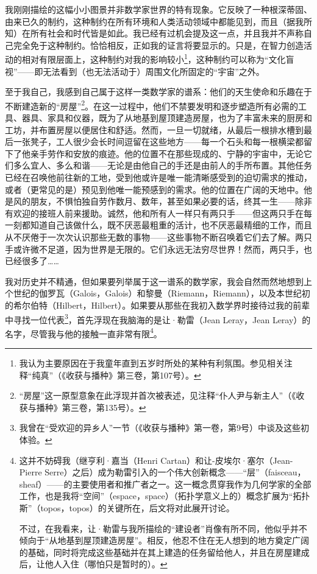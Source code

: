我刚刚描绘的这幅小小图景并非数学家世界的特有现象。它反映了一种根深蒂固、由来已久的制约，这种制约在所有环境和人类活动领域中都能见到，而且（据我所知）在所有社会和时代皆是如此。我已经有过机会提及这一点，并且我并不声称自己完全免于这种制约。恰恰相反，正如我的证言将要显示的。只是，在智力创造活动的相对有限层面上，这种制约对我的影响较小\footnote{我认为主要原因在于我童年直到五岁时所处的某种有利氛围。参见相关注释“纯真”（《收获与播种》第三卷，第107号）。}，这种制约可以称为“文化盲视”——即无法看到（也无法活动于）周围文化所固定的“宇宙”之外。

至于我自己，我感到自己属于这样一类数学家的谱系：他们的天生使命和乐趣在于不断建造新的“房屋”\footnote{“房屋”这一原型意象在此浮现并首次被表述，见注释“仆人尹与新主人”（《收获与播种》第三卷，第135号）。}。在这一过程中，他们不禁要发明和逐步塑造所有必需的工具、器具、家具和仪器，既为了从地基到屋顶建造房屋，也为了丰富未来的厨房和工坊，并布置房屋以便居住和舒适。然而，一旦一切就绪，从最后一根排水槽到最后一张凳子，工人很少会长时间逗留在这些地方——每一个石头和每一根横梁都留下了他亲手劳作和安放的痕迹。他的位置不在那些现成的、宁静的宇宙中，无论它们多么宜人、多么和谐——无论是由他自己的手还是由前人的手所布置。其他任务已经在召唤他前往新的工地，受到他或许是唯一能清晰感受到的迫切需求的推动，或者（更常见的是）预见到他唯一能预感到的需求。他的位置在广阔的天地中。他是风的朋友，不惧怕独自劳作数月、数年，甚至如果必要的话，终其一生——除非有欢迎的接班人前来援助。诚然，他和所有人一样只有两只手——但这两只手在每一刻都知道自己该做什么，既不厌恶最粗重的活计，也不厌恶最精细的工作，而且从不厌倦于一次次认识那些无数的事物——这些事物不断召唤着它们去了解。两只手或许微不足道，因为世界是无限的。它们永远无法穷尽世界！然而，两只手，也已经很多了……

我对历史并不精通，但如果要列举属于这一谱系的数学家，我会自然而然地想到上个世纪的伽罗瓦（Galois，Galois）和黎曼（Riemann，Riemann），以及本世纪初的希尔伯特（Hilbert，Hilbert）。如果要从那些在我初入数学界时接待过我的前辈中寻找一位代表\footnote{我曾在“受欢迎的异乡人”一节（《收获与播种》第一卷，第9号）中谈及这些初体验。}，首先浮现在我脑海的是让·勒雷（Jean Leray，Jean Leray）的名字，尽管我与他的接触一直非常有限\footnote{这并不妨碍我（继亨利·嘉当（Henri Cartan）和让-皮埃尔·塞尔（Jean-Pierre Serre）之后）成为勒雷引入的一个伟大创新概念——“层”（faisceau，sheaf）——的主要使用者和推广者之一。这一概念贯穿我作为几何学家的全部工作，也是我将“空间”（espace，space）（拓扑学意义上的）概念扩展为“拓扑斯”（topos，topos）的关键所在，后文将对此展开讨论。

不过，在我看来，让·勒雷与我所描绘的“建设者”肖像有所不同，他似乎并不倾向于“从地基到屋顶建造房屋”。相反，他忍不住在无人想到的地方奠定广阔的基础，同时将完成这些基础并在其上建造的任务留给他人，并且在房屋建成后，让他人入住（哪怕只是暂时的）。}。

